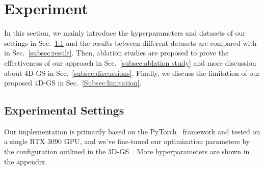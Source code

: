 \documentclass[10pt,twocolumn,letterpaper]{article}
\begin{document}
\begin{table} 
\centering
\small
\caption{Quantitative results on HyperNeRF~\cite{park2021hypernerf} vrig dataset with the rendering resolution of 960$\times$540.}
\label{tab:hypernerf}
\end{table}







\section{Experiment}

In this section, we mainly introduce the hyperparameters and datasets of our settings in Sec.~\ref{Experimental Setting} and the results between different datasets are compared with \cite{tineuvox,msth,wang2023mixedvoxels,lin2023im4d,attal2023hyperreel,hexplane,kplanes,3dgs,song2023nerfplayer} in Sec.~\ref{subsec:result}. Then, ablation studies are proposed to prove the effectiveness of our approach in Sec.~\ref{subsec:ablation study} and more discussion about 4D-GS in Sec.~\ref{subsec:discussions}. Finally, we discuss the limitation of our proposed 4D-GS in Sec.~\ref{Subsec:limitation}.
\subsection{Experimental Settings}
\label{Experimental Setting}
Our implementation is primarily based on the PyTorch~\cite{pytorch} framework and tested on a single RTX 3090 GPU, and we've fine-tuned our optimization parameters by the configuration outlined in the 3D-GS~\cite{3dgs}. More hyperparameters are shown in the appendix.
\end{document}
